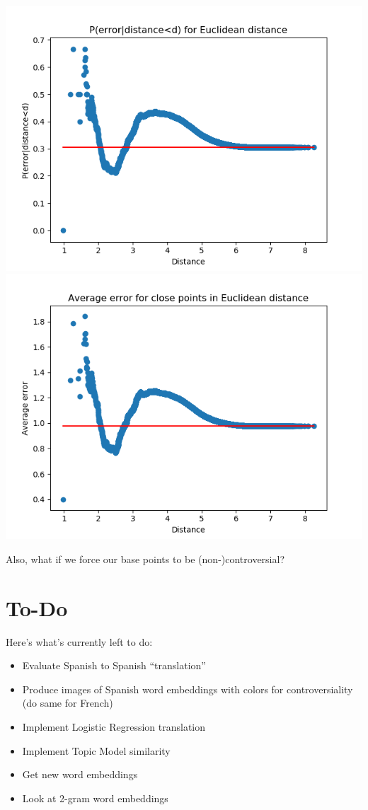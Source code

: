 \documentclass[11pt]{article} %
\begin{document}
\includegraphics[scale=0.5]{conditionalperror_euclid.png} \includegraphics[scale=0.5]{conditionalavgerror_euclid.png}

Also, what if we force our base points to be (non-)controversial?



\section{To-Do}
Here's what's currently left to do:
\begin{itemize}
\item Evaluate Spanish to Spanish ``translation''
\item Produce images of Spanish word embeddings with colors for controversiality (do same for French)
\item Implement Logistic Regression translation
\item Implement Topic Model similarity
\item Get new word embeddings
\item Look at 2-gram word embeddings
\end{itemize}
\end{document}
